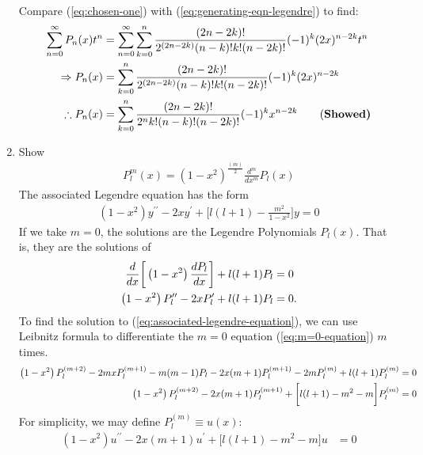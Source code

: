 \begin{enumerate}
\begin{align}
    \end{align}
    Compare (\ref{eq:chosen-one}) with (\ref{eq:generating-eqn-legendre}) to find:
    \begin{align}
        \sum_{n=0}^\infty P_n(x)t^n&=\sum_{n=0}^\infty\sum_{k=0}^n\frac{\left(2n-2k\right)!}{2^{(2n-2k)}(n-k)!k!(n-2k)!}(-1)^k(2x)^{n-2k}t^n\notag\\
        \Rightarrow P_n(x)&=\sum_{k=0}^n\frac{\left(2n-2k\right)!}{2^{(2n-2k)}(n-k)!k!(n-2k)!}(-1)^k(2x)^{n-2k}\notag\\
        \therefore P_n(x)&=\sum_{k=0}^n\frac{\left(2n-2k\right)!}{2^nk!(n-k)!(n-2k)!}(-1)^kx^{n-2k}\label{eq:p_l(x)-solution}\qquad\text{(\bf Showed)}
    \end{align}
    \bigskip\bigskip\hline\hline\bigskip
    \item Show 
    \begin{align}
        P_l^m(x) = (1 - x^2)^{\displaystyle\frac{(m)}{2}} \frac{d^m}{dx^m} P_l(x)
    \end{align}
    \bigskip\bigskip\hline\hline\bigskip
    The associated Legendre equation has the form
    \begin{align}
        \left(1-x^2\right)y^{\prime\prime}-2xy^{\prime}+\bigg[l(l+1)-\frac{m^2}{1-x^2}\bigg]y=0\label{eq:associated-legendre-equation}
    \end{align}
    If we take $m=0$, the solutions are the Legendre Polynomials $P_l(x)$. That is, they are the solutions of
    \begin{align}
        \frac{d}{dx}\bigg[\left(1-x^2\right)\frac{dP_l}{dx}\bigg]+l(l+1)P_l&=0\notag\\
        \left(1-x^2\right)P_l^{\prime\prime}-2xP_l^{\prime}+l(l+1)P_l&=0.\label{eq:m=0-equation}
    \end{align}
    To find the solution to (\ref{eq:associated-legendre-equation}), we can use Leibnitz formula to differentiate the $m=0$ equation (\ref{eq:m=0-equation}) $m$ times.
    \begin{align}
        \left(1-x^2\right)P_l^{(m+2)}-2mxP_l^{(m+1)}-m(m-1)P_l-2x(m+1)P_l^{(m+1)}-2mP_l^{(m)}+l(l+1)P_l^{(m)}&=0\notag\\
        \left(1-x^2\right)P_l^{(m+2)}-2x(m+1)P_l^{(m+1)}+\bigg[l(l+1)-m^2-m\bigg]P_l^{(m)}&=0\label{eq;legendre-with-m-terms-leibnitz}
    \end{align}
    For simplicity, we may define $P_l^{(m)}\equiv u(x)$:
    \begin{align}
        \left(1-x^2\right)u^{\prime\prime}-2x(m+1)u^{\prime}+\bigg[l(l+1)-m^2-m\bigg]u&=0\label{eq;legendre-with-m-terms-leibnitz-with-u-subs}

\end{align}
\end{enumerate}

